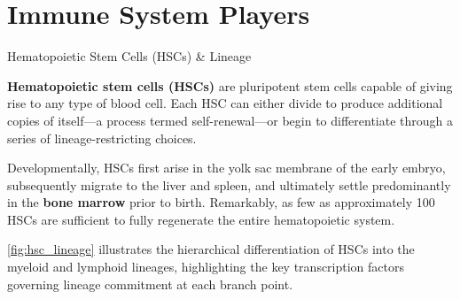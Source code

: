
\section{Immune System Players}

  \begin{core}[label=core:hsc]{Hematopoietic Stem Cells (HSCs) \& Lineage}

    \textbf{Hematopoietic stem cells (HSCs)} are pluripotent stem cells capable of giving rise to any type of blood cell. Each HSC can either divide to produce additional copies of itself---a process termed self-renewal---or begin to differentiate through a series of lineage-restricting choices.

    Developmentally, HSCs first arise in the yolk sac membrane of the early embryo, subsequently migrate to the liver and spleen, and ultimately settle predominantly in the \textbf{bone marrow} prior to birth. Remarkably, as few as approximately 100 HSCs are sufficient to fully regenerate the entire hematopoietic system.

    \autoref{fig:hsc_lineage} illustrates the hierarchical differentiation of HSCs into the myeloid and lymphoid lineages, highlighting the key transcription factors governing lineage commitment at each branch point.


\end{core}

